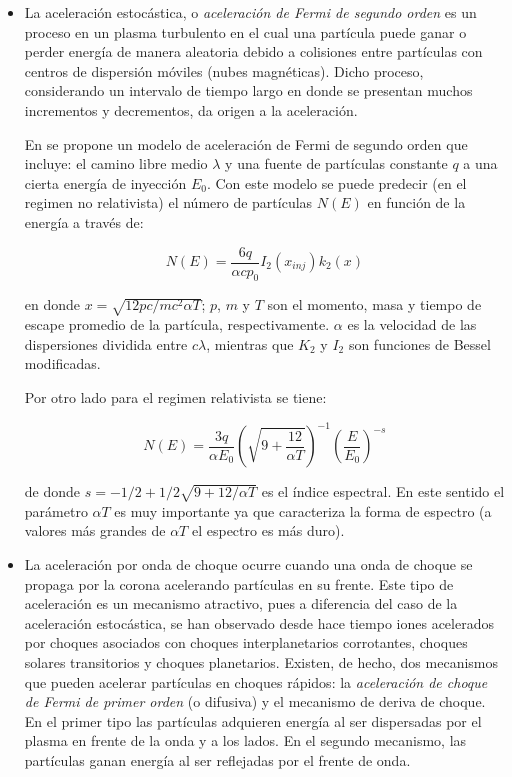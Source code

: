 \begin{itemize}
  \item La aceleración estocástica, o \emph{aceleración de Fermi de segundo orden} es un proceso en un plasma turbulento en el cual una partícula puede ganar o perder energía de manera aleatoria debido a colisiones entre partículas con centros de dispersión móviles (nubes magnéticas). Dicho proceso, considerando un intervalo de tiempo largo en donde se presentan muchos incrementos y decrementos, da origen a la aceleración.

  En \cite{ramaty87} se propone un modelo de aceleración de Fermi de segundo orden que incluye: el camino libre medio $\lambda$ y una fuente de partículas constante $q$ a una cierta energía de inyección $E_{0}$. Con este modelo se puede predecir (en el regimen no relativista) el número de partículas $N(E)$ en función de la energía a través de:

  \begin{equation}
  \label{equ:fermi-norela}
  N(E)=\frac{6q}{\alpha c p_{0}}I_{2}(x_{inj})k_{2}(x)
  \end{equation}

  en donde $x=\sqrt{12pc/mc^{2}\alpha T}$; $p$, $m$ y $T$ son el momento, masa y tiempo de escape promedio de la partícula, respectivamente. $\alpha$ es la velocidad de las dispersiones dividida entre $c \lambda$, mientras que $K_{2}$ y $I_{2}$ son funciones de Bessel modificadas.

  Por otro lado para el regimen relativista se tiene:

  \begin{equation}
  \label{equ:fermi-ulrela}
  N(E)=\frac{3q}{\alpha E_{0}}\left(\sqrt{9+\frac{12}{\alpha T}}\right)^{-1}\left(\frac{E}{E_{0}}\right)^{-s}
  \end{equation}

  de donde $s=-1/2+1/2\sqrt{9+12/\alpha T}$ es el índice espectral. En este sentido el parámetro $\alpha T$ es muy importante ya que caracteriza la forma de espectro (a valores más grandes de $\alpha T$ el espectro es más duro).

  \item La aceleración por onda de choque ocurre cuando una onda de choque se propaga por la corona acelerando partículas en su frente. Este tipo de aceleración es un mecanismo atractivo, pues a diferencia del caso de la aceleración estocástica, se han observado desde hace tiempo iones acelerados por choques asociados con choques interplanetarios corrotantes, choques solares transitorios y choques planetarios. Existen, de hecho, dos mecanismos que pueden acelerar partículas en choques rápidos: la \emph{aceleración de choque de Fermi de primer orden} (o difusiva) y el mecanismo de deriva de choque. En el primer tipo las partículas adquieren energía al ser dispersadas por el plasma en frente de la onda y a los lados. En el segundo mecanismo, las partículas ganan energía al ser reflejadas por el frente de onda.


\end{itemize}
